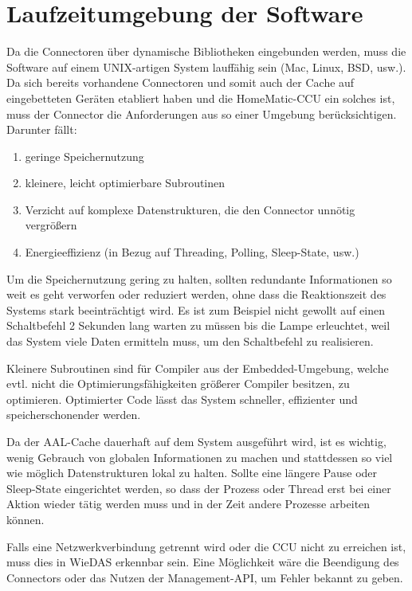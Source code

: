 \section{Laufzeitumgebung der Software}
\label{ana_laufzeitumgebung}

Da die Connectoren über dynamische Bibliotheken eingebunden werden, muss die Software
auf einem UNIX-artigen System lauffähig sein (Mac, Linux, BSD, usw.).
Da sich bereits vorhandene Connectoren und somit auch der Cache auf eingebetteten Geräten
etabliert haben und die HomeMatic-CCU ein solches ist, muss der Connector die Anforderungen
aus so einer Umgebung berücksichtigen.
Darunter fällt:
\begin{enumerate}
\item geringe Speichernutzung
\item kleinere, leicht optimierbare Subroutinen
\item Verzicht auf komplexe Datenstrukturen, die den Connector unnötig vergrößern
\item Energieeffizienz (in Bezug auf Threading, Polling, Sleep-State, usw.)
\end{enumerate}

Um die Speichernutzung gering zu halten, sollten redundante Informationen so weit es geht
verworfen oder reduziert werden, ohne dass die Reaktionszeit des Systems stark beeinträchtigt wird.
Es ist zum Beispiel nicht gewollt auf einen Schaltbefehl 2 Sekunden lang warten zu müssen
bis die Lampe erleuchtet, weil das System viele Daten ermitteln muss, um den Schaltbefehl zu realisieren.

Kleinere Subroutinen sind für Compiler aus der Embedded-Umgebung, welche evtl. nicht die
Optimierungsfähigkeiten größerer Compiler besitzen, zu optimieren.
Optimierter Code lässt das System schneller, effizienter und speicherschonender werden.

Da der AAL-Cache dauerhaft auf dem System ausgeführt wird, ist es wichtig, wenig Gebrauch
von globalen Informationen zu machen und stattdessen so viel wie möglich Datenstrukturen
lokal zu halten.
Sollte eine längere Pause oder Sleep-State eingerichtet werden, so dass der Prozess oder
Thread erst bei einer Aktion wieder tätig werden muss und in der Zeit andere Prozesse
arbeiten können.

Falls eine Netzwerkverbindung getrennt wird oder die CCU nicht zu erreichen ist, muss dies
in WieDAS erkennbar sein.
Eine Möglichkeit wäre die Beendigung des Connectors oder das Nutzen der Management-API,
um Fehler bekannt zu geben.


